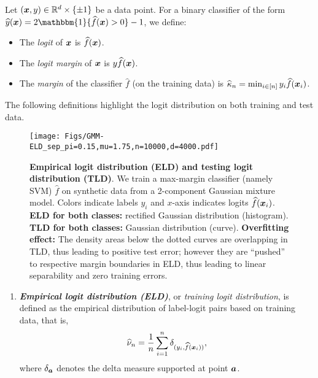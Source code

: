\begin{defn}
Let $(\text{\boldmath $x$}, y) \in \mathbb{R}^d \times \{ \pm 1 \}$ be a data point. For a binary classifier of the form $\hat y(\xx) = 2 \mathbbm{1}\{ \hat f(\vx) > 0\} - 1$, we define:
\begin{itemize}
    \item The \emph{logit} of $\text{\boldmath $x$}$ is $\widehat f(\text{\boldmath $x$})$.
    \item The \emph{logit margin} of $\text{\boldmath $x$}$ is $y \widehat f(\text{\boldmath $x$})$.
    \item The \emph{margin} of the classifier $\hat f$ (on the training data) is $\widehat\kappa_n = \min_{i \in [n]} y_i \widehat f({\boldsymbol{x}}_i)$.
\end{itemize}
\end{defn}
The following definitions highlight the logit distribution on both training and test data. 
\begin{defn}
\label{def:ELD_TLD}
\begin{figure}[t]
    \centering
    \texttt{[image: Figs/GMM-ELD\_sep\_pi=0.15,mu=1.75,n=10000,d=4000.pdf]}
    \caption{
    \textbf{Empirical logit distribution (ELD) and testing logit distribution (TLD)}. We train a max-margin classifier (namely SVM) $\hat f$ on synthetic data from a 2-component Gaussian mixture model. Colors indicate labels $y_i$ and $x$-axis indicates logits $\widehat f({\boldsymbol{x}}_i)$. \textbf{ELD for both classes:} rectified Gaussian distribution (histogram). \textbf{TLD for both classes:} Gaussian distribution (curve).  \textbf{Overfitting effect:} The density areas below the dotted curves are overlapping in TLD, thus leading to positive test error; however they are ``pushed'' to respective margin boundaries in ELD, thus leading to linear separability and zero training errors.
    }
    \label{fig:GMM_main}
\end{figure}

\begin{enumerate}
\item \textbf{\emph{Empirical logit distribution (ELD)}}, or \emph{training logit distribution}, is defined as the empirical distribution of label-logit pairs based on training data, %
that is,
\begin{equation}\label{eq:ELD}
\widehat\nu_n = \frac{1}{n} \sum_{i=1}^n \delta_{(y_i, \widehat f({\boldsymbol{x}}_i))},
\end{equation}
where $\delta_{{\boldsymbol{a}}}$ denotes the delta measure supported at point ${\boldsymbol{a}}$.



\end{enumerate}
\end{defn}
